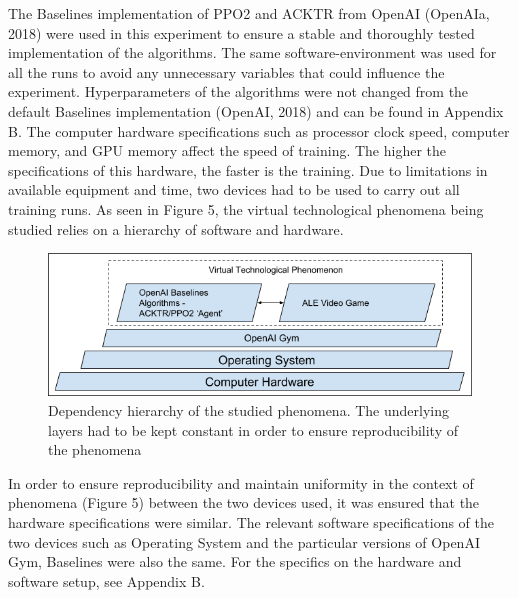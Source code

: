 The Baselines implementation of PPO2 and ACKTR from OpenAI (OpenAIa, 2018) were used in this experiment to ensure a stable and thoroughly tested implementation of the algorithms. 
The same software-environment was used for all the runs to avoid any unnecessary variables that could influence the experiment.
Hyperparameters of the algorithms were not changed from the default Baselines implementation (OpenAI, 2018) and can be found in Appendix B. The computer hardware specifications such as processor clock speed, computer memory, and GPU memory affect the speed of training. The higher the specifications of this hardware, the faster is the training. Due to limitations in available equipment and time, two devices had to be used to carry out all training runs. As seen in Figure 5, the virtual technological phenomena being studied relies on a hierarchy of software and hardware. 

\begin{figure}
	\includegraphics[width=\columnwidth]{fig5.png} 
	\caption{Dependency hierarchy of the studied phenomena. The underlying layers had to be kept constant in order to ensure reproducibility of the phenomena}
\end{figure}

In order to ensure reproducibility and maintain uniformity in the context of phenomena (Figure 5) between the two devices used, it was ensured that the hardware specifications were similar. The relevant software specifications of the two devices such as Operating System and the particular versions of OpenAI Gym, Baselines were also the same. For the specifics on the hardware and software setup, see Appendix B.

